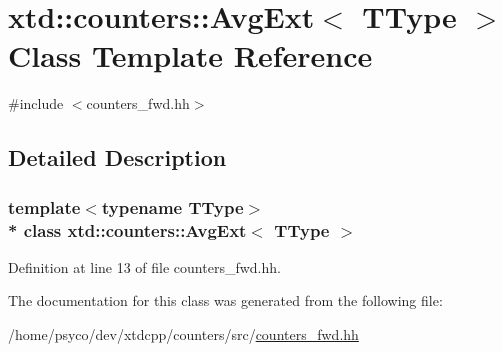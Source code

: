 \hypertarget{classxtd_1_1counters_1_1AvgExt}{}\section{xtd\+:\+:counters\+:\+:Avg\+Ext$<$ T\+Type $>$ Class Template Reference}
\label{classxtd_1_1counters_1_1AvgExt}


{\ttfamily \#include $<$counters\+\_\+fwd.\+hh$>$}



\subsection{Detailed Description}
\subsubsection*{template$<$typename T\+Type$>$\\*
class xtd\+::counters\+::\+Avg\+Ext$<$ T\+Type $>$}



Definition at line 13 of file counters\+\_\+fwd.\+hh.



The documentation for this class was generated from the following file\+:\begin{DoxyCompactItemize}
\item 
/home/psyco/dev/xtdcpp/counters/src/\hyperlink{counters__fwd_8hh}{counters\+\_\+fwd.\+hh}\end{DoxyCompactItemize}
